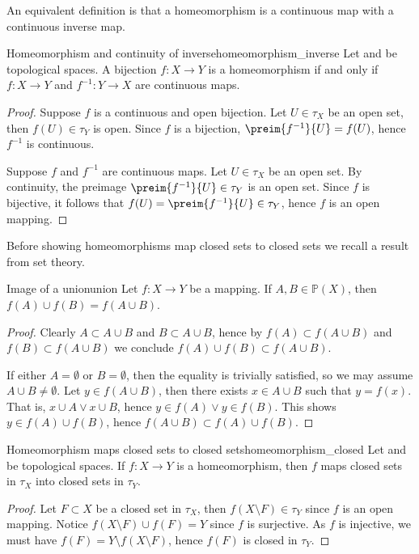 An equivalent definition is that a homeomorphism is a continuous map with a continuous inverse map.
\begin{theorem}{Homeomorphism and continuity of inverse}{homeomorphism_inverse}
    Let  and  be topological spaces. A bijection \(f : X \to Y\) is a homeomorphism if and only if \(f : X \to Y\) and \(f^{-1} : Y \to X\) are continuous maps.
\end{theorem}
\begin{proof}
    Suppose \(f\) is a continuous and open bijection. Let \(U \in \tau_X\) be an open set, then \(f(U) \in \tau_Y\) is open. Since \(f\) is a bijection, \(\preim{f^{-1}}{U} = f(U)\), hence \(f^{-1}\) is continuous.

    Suppose \(f\) and \(f^{-1}\) are continuous maps. Let \(U \in \tau_X\) be an open set. By continuity, the preimage \(\preim{f^{-1}}{U} \in \tau_Y\) is an open set. Since \(f\) is bijective, it follows that \(f(U) = \preim{f^{-1}}{U} \in \tau_Y\), hence \(f\) is an open mapping.
\end{proof}

Before showing homeomorphisms map closed sets to closed sets we recall a result from set theory.
\begin{lemma}{Image of a union}{union}
    Let \(f : X \to Y\) be a mapping. If \(A, B \in \mathbb{P}(X)\), then \(f(A) \cup f(B) = f(A \cup B)\).
\end{lemma}
\begin{proof}
    Clearly \(A \subset A\cup B\) and \(B \subset A\cup B\), hence by \(f(A) \subset f(A \cup B)\) and \(f(B) \subset f(A \cup B)\) we conclude \(f(A) \cup f(B) \subset f(A \cup B)\).

    If either \(A = \emptyset\) or \(B = \emptyset\), then the equality is trivially satisfied, so we may assume \(A \cup B \neq \emptyset\). Let \(y \in f(A \cup B)\), then there exists \(x \in A \cup B\) such that \(y = f(x)\). That is, \(x \cup A \lor x \cup B\), hence \(y \in f(A) \lor y \in f(B)\). This shows \(y \in f(A) \cup f(B)\), hence \(f(A \cup B) \subset f(A) \cup f(B)\).
\end{proof}

\begin{proposition}{Homeomorphism maps closed sets to closed sets}{homeomorphism_closed}
    Let  and  be topological spaces. If \(f : X \to Y\) is a homeomorphism, then \(f\) maps closed sets in \(\tau_X\) into closed sets in \(\tau_Y\).
\end{proposition}
\begin{proof}
    Let \(F\subset X\) be a closed set in \(\tau_X\), then \(f(X \setminus F) \in \tau_Y\) since \(f\) is an open mapping. Notice \(f(X \setminus F) \cup f(F) = Y\) since \(f\) is surjective. As \(f\) is injective, we must have \(f(F) = Y \setminus f(X\setminus F)\), hence \(f(F)\) is closed in \(\tau_Y\).
\end{proof}

